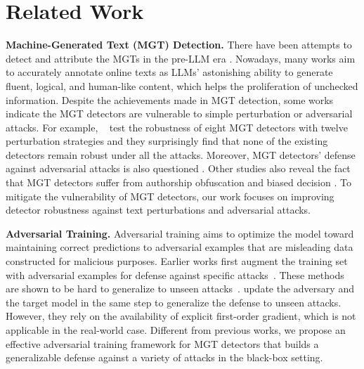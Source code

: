 \section{Related Work}

\noindent \textbf{Machine-Generated Text (MGT) Detection.} 
There have been attempts to detect and attribute the MGTs in the pre-LLM era \cite{zhong2020neural, uchendu2020authorship}.
Nowadays, many works \cite{mitchell2023detectgpt, wang2023seqxgpt, liu2022coco, kushnareva2024ai, guodetective} aim to accurately annotate online texts as LLMs' astonishing ability to generate fluent, logical, and human-like content, which helps the proliferation of unchecked information.
Despite the achievements made in MGT detection, some works indicate the MGT detectors are vulnerable to simple perturbation or adversarial attacks.
For example, ~\citet{wang2024stumbling} test the robustness of eight MGT detectors with twelve perturbation strategies and they surprisingly find that none of the existing detectors remain robust under all
the attacks.
Moreover, MGT detectors' defense against adversarial attacks is also questioned \cite{fishchuk2023adversarial}.
Other studies also reveal the fact that MGT detectors suffer from authorship obfuscation \cite{macko2024authorship} and biased decision \cite{liang2023gpt}.
To mitigate the vulnerability of MGT detectors, our work focuses on improving detector robustness against text perturbations and adversarial attacks.

\noindent \textbf{Adversarial Training.} 
Adversarial training aims to optimize the model toward maintaining correct predictions to adversarial examples that are misleading data constructed for malicious purposes.
Earlier works first augment the training set with adversarial examples for defense against specific attacks~\cite{huang2024cert, zeng2023certified}.
These methods are shown to be hard to generalize to unseen attacks~\cite{wang2024comprehensive}.
\citet{yoo2021towards, li2021tavat} update the adversary and the target model in the same step to generalize the defense to unseen attacks.
However, they rely on the availability of explicit first-order gradient, which is not applicable in the real-world case.
Different from previous works, we propose an effective adversarial training framework for MGT detectors that builds a generalizable defense against a variety of attacks in the black-box setting.

